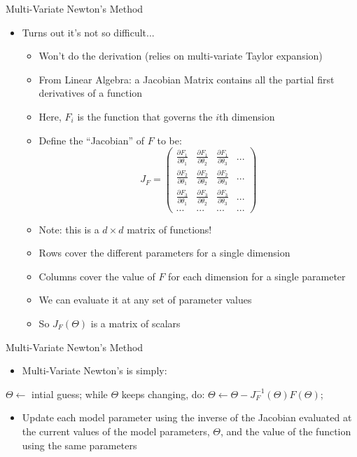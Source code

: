 \documentclass[aspectratio=169]{beamer}
\newenvironment{noindentitemize}
{ \begin{itemize}
 \setlength{\itemsep}{1.5ex}
  \setlength{\parsep}{0pt}   
  \setlength{\parskip}{0pt}
 \addtolength{\leftskip}{-2em}
 }
{ \end{itemize} }
\begin{document}
\begin{frame}{Multi-Variate Newton's Method}

\begin{itemize}
\item Turns out it's not so difficult...
	\begin{itemize}
	\item Won't do the derivation (relies on multi-variate Taylor expansion)
	\item From Linear Algebra: a Jacobian Matrix contains all the partial first derivatives of a function
	\item Here, $F_i$ is the function that governs the $i$th dimension
	\item Define the ``Jacobian'' of $F$ to be:
	$$ J_F = \left( \begin{array}{cccc}
	\frac{\partial F_1}{\partial \theta_1} & \frac{\partial F_1}{\partial \theta_2} & \frac{\partial F_1}{\partial \theta_3} & ... \\
	\frac{\partial F_2}{\partial \theta_1} & \frac{\partial F_2}{\partial \theta_2} & \frac{\partial F_2}{\partial \theta_3} & ... \\
	\frac{\partial F_3}{\partial \theta_1} & \frac{\partial F_3}{\partial \theta_2} & \frac{\partial F_3}{\partial \theta_3} & ... \\
	... & ... & ... & ... 
	 \end{array} \right)$$
	\item Note: this is a $d \times d$ matrix of functions!
	\item Rows cover the different parameters for a single dimension
	\item Columns cover the value of $F$ for each dimension for a single parameter
	\item We can evaluate it at any set of parameter values
	\item So $J_F(\Theta)$ is a matrix of scalars
	\end{itemize}
\end{itemize}

\end{frame}
\begin{frame}[fragile]{Multi-Variate Newton's Method}

\begin{noindentitemize}
\item Multi-Variate Newton's is simply:
\end{noindentitemize}
\begin{SQL}
$\Theta \leftarrow$ intial guess;
while $\Theta$ keeps changing, do:
  $\Theta \leftarrow \Theta - J_F^{-1}(\Theta)F(\Theta)$;
\end{SQL}
\begin{noindentitemize}
\item Update each model parameter using the inverse of the Jacobian evaluated at the current values of the model parameters, $\Theta$, and the value of the function using the same parameters
\end{noindentitemize}
\end{frame}
\end{document}

